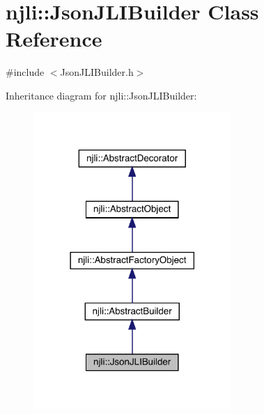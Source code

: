\hypertarget{classnjli_1_1_json_j_l_i_builder}{}\section{njli\+:\+:Json\+J\+L\+I\+Builder Class Reference}
\label{classnjli_1_1_json_j_l_i_builder}


{\ttfamily \#include $<$Json\+J\+L\+I\+Builder.\+h$>$}



Inheritance diagram for njli\+:\+:Json\+J\+L\+I\+Builder\+:\nopagebreak
\begin{figure}[H]
\begin{center}
\leavevmode
\includegraphics[width=213pt]{classnjli_1_1_json_j_l_i_builder__inherit__graph}
\end{center}
\end{figure}


